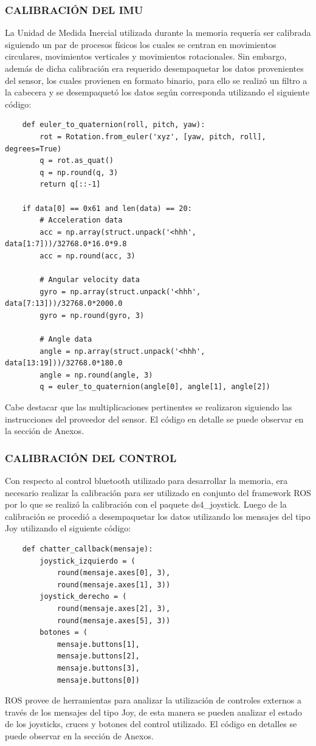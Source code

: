 \subsubsection{CALIBRACIÓN DEL IMU}
La Unidad de Medida Inercial utilizada durante la memoria requería ser calibrada siguiendo un par de procesos físicos los cuales se centran en movimientos circulares, movimientos verticales y movimientos rotacionales. Sin embargo, además de dicha calibración era requerido desempaquetar los datos provenientes del sensor, los cuales provienen en formato binario, para ello se realizó un filtro a la cabecera y se desempaquetó los datos según corresponda utilizando el siguiente código:
\begin{verbatim}
    def euler_to_quaternion(roll, pitch, yaw):
        rot = Rotation.from_euler('xyz', [yaw, pitch, roll], degrees=True)
        q = rot.as_quat()
        q = np.round(q, 3)
        return q[::-1]
        
    if data[0] == 0x61 and len(data) == 20:
        # Acceleration data
        acc = np.array(struct.unpack('<hhh', data[1:7]))/32768.0*16.0*9.8
        acc = np.round(acc, 3)

        # Angular velocity data
        gyro = np.array(struct.unpack('<hhh', data[7:13]))/32768.0*2000.0
        gyro = np.round(gyro, 3)
            
        # Angle data
        angle = np.array(struct.unpack('<hhh', data[13:19]))/32768.0*180.0
        angle = np.round(angle, 3)
        q = euler_to_quaternion(angle[0], angle[1], angle[2])
\end{verbatim}

Cabe destacar que las multiplicaciones pertinentes se realizaron siguiendo las instrucciones del proveedor del sensor. El código en detalle se puede observar en la sección de Anexos.

\subsubsection{CALIBRACIÓN DEL CONTROL}
Con respecto al control bluetooth utilizado para desarrollar la memoria, era necesario realizar la calibración para ser utilizado en conjunto del framework ROS por lo que se realizó la calibración con el paquete ds4\_joystick. Luego de la calibración se procedió a desempaquetar los datos utilizando los mensajes del tipo Joy utilizando el siguiente código:
\begin{verbatim}
    def chatter_callback(mensaje):
        joystick_izquierdo = (
            round(mensaje.axes[0], 3), 
            round(mensaje.axes[1], 3))
        joystick_derecho = (
            round(mensaje.axes[2], 3), 
            round(mensaje.axes[5], 3))
        botones = (
            mensaje.buttons[1], 
            mensaje.buttons[2], 
            mensaje.buttons[3], 
            mensaje.buttons[0]) 
\end{verbatim}
ROS provee de herramientas para analizar la utilización de controles externos a través de los mensajes del tipo Joy, de esta manera se pueden analizar el estado de los joysticks, cruces y botones del control utilizado. El código en detalles se puede observar en la sección de Anexos.

